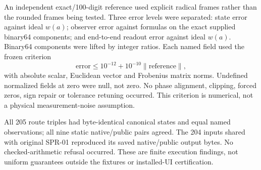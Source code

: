 \documentclass[11pt,a4paper]{article}
\begin{document}
An independent exact/100-digit reference used explicit radical frames rather than the rounded frames being tested. Three error levels were separated: state error against ideal $w(a)$; observer error against formulas on the exact supplied binary64 components; and end-to-end readout error against ideal $w(a)$. Binary64 components were lifted by integer ratios. Each named field used the frozen criterion
\begin{equation}
\mathrm{error}\le10^{-12}+10^{-10}\|\mathrm{reference}\|,\label{eq:criterion}
\end{equation}
with absolute scalar, Euclidean vector and Frobenius matrix norms. Undefined normalized fields at zero were null, not zero. No phase alignment, clipping, forced zeros, sign repair or tolerance retuning occurred. This criterion is numerical, not a physical measurement-noise assumption.

All 205 route triples had byte-identical canonical states and equal named observations; all nine static native/public pairs agreed. The 204 inputs shared with original SPR-01 reproduced its saved native/public output bytes. No checked-arithmetic refusal occurred. These are finite execution findings, not uniform guarantees outside the fixtures or installed-UI certification.

\clearpage
\end{document}
